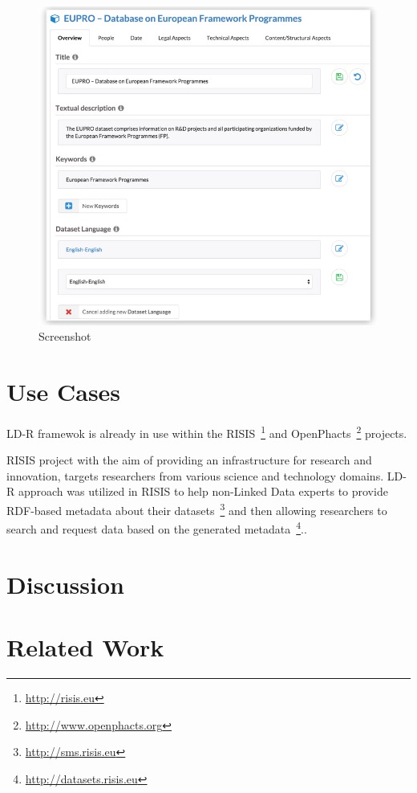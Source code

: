 \documentclass{acm_proc_article-sp}
\begin{document}
\begin{figure}[tb]
  \includegraphics[width=.9\linewidth]{images/screenshot.jpg}
  \caption{Screenshot}
\end{figure}

\section{Use Cases}

LD-R framewok is already in use within the RISIS~\footnote{\url{http://risis.eu}} and OpenPhacts~\footnote{\url{http://www.openphacts.org}} projects.

RISIS project with the aim of providing an infrastructure for research and innovation, targets researchers from various science and technology domains.
LD-R approach was utilized in RISIS to help non-Linked Data experts to provide RDF-based metadata about their datasets~\footnote{\url{http://sms.risis.eu}} and then allowing researchers to search and request data based on the generated metadata~\footnote{\url{http://datasets.risis.eu}}..



\section{Discussion}

\section{Related Work}
\end{document}
